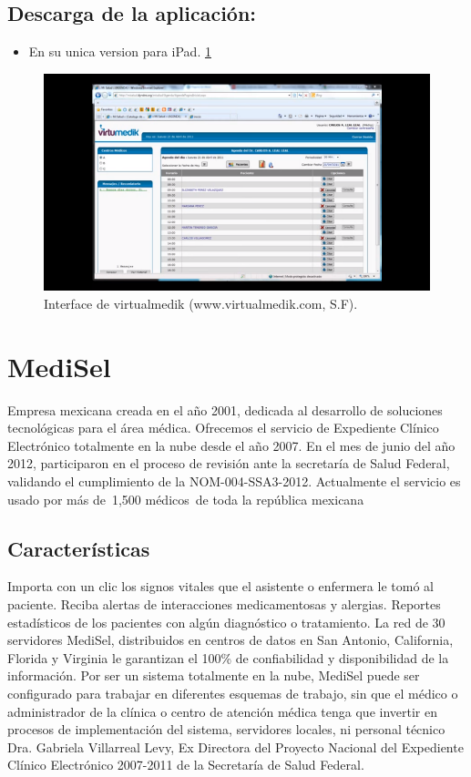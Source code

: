 \subsection{Descarga de la aplicación:}
\begin{itemize}
  \item En su unica version para iPad.
  \ref{figura2}
\end{itemize}

\begin{figure}[h]
  \centering
  \label{figura2}
  \includegraphics[scale=1]{lib/assets/2}
  \caption{Interface de virtualmedik (www.virtualmedik.com, S.F).}
\end{figure}

\section{MediSel}
Empresa mexicana creada en el año 2001, dedicada al desarrollo de soluciones tecnológicas para el área médica.
Ofrecemos el servicio de Expediente Clínico Electrónico totalmente en la nube desde el año 2007. En el mes de junio del año 2012, participaron en el proceso de revisión ante la secretaría de Salud Federal, validando el cumplimiento de la NOM-004-SSA3-2012.
Actualmente el servicio es usado por más de 1,500 médicos de toda la república mexicana \cite{Villareal}
\subsection{Características}
Importa con un clic los signos vitales que el asistente o enfermera le tomó al paciente. Reciba alertas de interacciones medicamentosas y alergias. Reportes estadísticos de los pacientes con algún diagnóstico o tratamiento. La red de 30 servidores MediSel, distribuidos en centros de datos en San Antonio, California, Florida y Virginia le garantizan el 100\% de confiabilidad y disponibilidad de la información. Por ser un sistema totalmente en la nube, MediSel puede ser configurado para trabajar en diferentes esquemas de trabajo, sin que el médico o administrador de la clínica o centro de atención médica tenga que invertir en procesos de implementación del sistema, servidores locales, ni personal técnico \cite{Villareal}
Dra. Gabriela Villarreal Levy, Ex Directora del Proyecto Nacional del Expediente Clínico Electrónico 2007-2011 de la Secretaría de Salud Federal.

